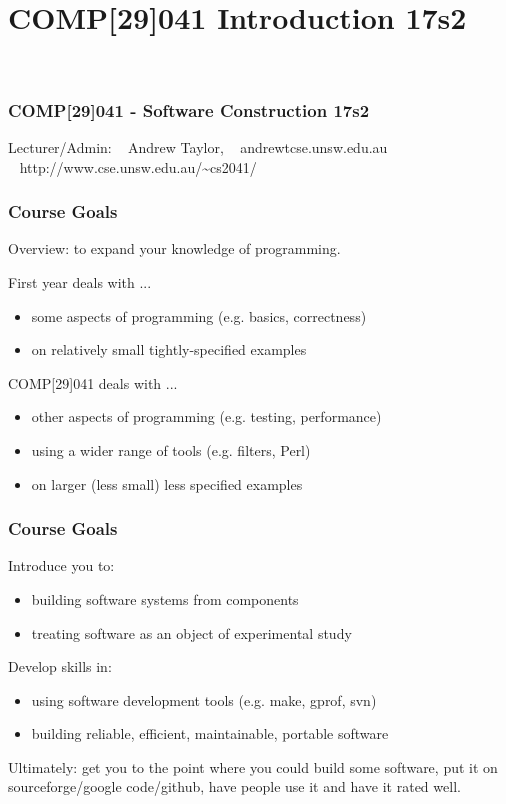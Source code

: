 

\section{COMP[29]041 Introduction 17s2}
\begin{frame}
~
\frametitle{COMP[29]041 - Software Construction 17s2}


\begin{center}
Lecturer/Admin: ~ Andrew Taylor, ~ {\small andrewt{\makeatletter@\makeatother}cse.unsw.edu.au} \\


~ http://www.cse.unsw.edu.au/{\textasciitilde}cs2041/
\end{center}
\end{frame}

\begin{frame}
\frametitle{Course Goals}
Overview: to expand your knowledge of programming.

First year deals with ...
\begin{itemize}
\item  some aspects of programming {\small (e.g. basics, correctness)}
\item  on relatively small tightly-specified examples
\end{itemize}
COMP[29]041 deals with ...
\begin{itemize}
\item  other aspects of programming {\small (e.g. testing, performance)}
\item  using a wider range of tools {\small (e.g. filters, Perl)}
\item  on larger (less small) less specified examples
\end{itemize}
\end{frame}

\begin{frame}
\frametitle{Course Goals}
Introduce you to:
\begin{itemize}
\item  building software systems from components
\item  treating software as an object of experimental study
\end{itemize}
Develop skills in:
\begin{itemize}
\item  using software development tools {\small (e.g.  make, gprof, svn)}
\item  building reliable, efficient, maintainable, portable software
\end{itemize}
{\small 
Ultimately: get you to the point where you could build some
software, put it on sourceforge/google code/github, have people use it and have
it rated well.
}
\end{frame}


